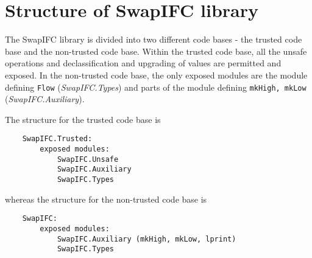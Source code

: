 \chapter{Structure of SwapIFC library}
\label{app:library_structure}
The SwapIFC library is divided into two different code bases - the trusted code base and the non-trusted code base. Within the trusted code base, all the unsafe operations and declassification and upgrading of values are permitted and exposed. In the non-trusted code base, the only exposed modules are the module defining {\tt Flow} (\emph{SwapIFC.Types}) and parts of the module defining {\tt mkHigh, mkLow} (\emph{SwapIFC.Auxiliary}).

The structure for the trusted code base is
\begin{verbatim}
    SwapIFC.Trusted:
        exposed modules:
            SwapIFC.Unsafe
            SwapIFC.Auxiliary
            SwapIFC.Types
\end{verbatim}
whereas the structure for the non-trusted code base is
\begin{verbatim}
    SwapIFC:
        exposed modules:
            SwapIFC.Auxiliary (mkHigh, mkLow, lprint)
            SwapIFC.Types
\end{verbatim}
